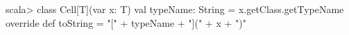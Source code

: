 

\Exercise{\ExeWeekNINE}

\begin{Goals}
\item 
\end{Goals}

\begin{Preparations}
\item 
\end{Preparations}

\BasicTasks %

\Task 
\begin{REPL}
scala> class Cell[T](var x: T){
         val typeName: String = x.getClass.getTypeName
         override def toString = "[" + typeName + "](" + x + ")"
       }
\end{REPL}

\Subtask 

\ExtraTasks %

\Task 

\AdvancedTasks %

\Task     
    